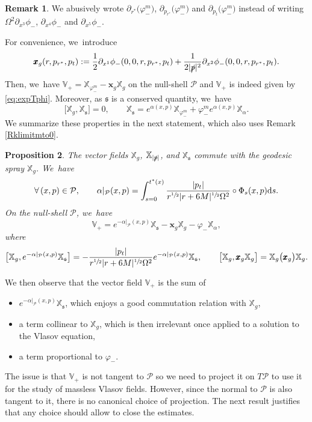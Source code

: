 \documentclass[JEP,XML,SOM,Unicode,published]{cedram}
\theoremstyle{plain}
\newtheorem{proposition}{Proposition}[section]
\theoremstyle{definition}
\newtheorem{remark}[proposition]{Remark}
\newcommand\T{{\mathbb{X}}}
\newcommand\dr{{\mathrm{d}}}
\begin{document}
\begin{remark}\label{Rkabuse}
We abusively wrote $\partial_{r^*}\bigl(\varphi_-^m \bigr)$, $\partial_{p_{r^*}}\bigl(\varphi_-^m \bigr)$ and $\partial_{p_t}\bigl(\varphi_-^m \bigr)$ instead of writing $\Omega^2 \partial_{x^3}\phi_-$, $\partial_{x^4} \phi_-$ and $\partial_{x^5} \phi_-$.
\end{remark} For convenience, we~introduce
\[
\pmb{x}_g(r,p_{r^*},p_t) := \frac{1}{2}\partial_{x^1} \phi_-(0,0,r,p_{r^*},p_t) +\frac{1}{2|\slashed{p}|^2} \partial_{x^2} \phi_- (0,0,r,p_{r^*},p_t).
\]
Then, we~have $\mathbb{V}_+=\T_{\varphi_-^m}-\pmb{x}_g \T_g$ on the null-shell $\mathcal{P}$ and $\mathbb{V}_+$ is indeed given by \eqref{eq:expTphi}. Moreover, as $\mathfrak{s}$ is a conserved quantity, we~have
\[
\bigl[ \T_g, \T_{\mathfrak{s}} \bigr]=0,\qquad \T_{\mathfrak{s}} = e^{\alpha (x,p)} \T_{\varphi_-^m}+\varphi_-^m e^{\alpha (x,p)} \T_{\alpha}.
\]
We summarize these properties in the next statement, which also uses Remark \ref{Rklimitmto0}.
\begin{proposition}\label{ProB2}
The vector fields $\T_g$, $\T_{|\slashed{p}|}$, and $\T_{\mathfrak{s}}$ commute with the geodesic spray $\T_g$. We~have
\[
\forall \, (x,p) \in \mathcal{P}, \qquad \alpha \vert_{\mathcal{P}} (x,p) = \int_{s=0}^{t^*(x)} \frac{|p_t|}{r^{\sfrac{1}{2}}|r+6M|^{\sfrac{1}{2}}\Omega^2} \circ \Phi_{s}(x,p) \dr s.
\]
On the null-shell $\mathcal{P}$, we~have
\[
\mathbb{V}_+ = e^{-\alpha \vert_{\mathcal{P}}(x,p)} \T_{\mathfrak{s}}-\pmb{x}_g \T_g-\varphi_- \T_{\alpha},
\]
where
\[
\bigl[\T_g, e^{-\alpha \vert_{\mathcal{P}}(x,p)} \T_{\mathfrak{s}} \bigr] = -\frac{|p_t|}{r^{\sfrac{1}{2}}|r+6M|^{\sfrac{1}{2}}\Omega^2} e^{-\alpha \vert_{\mathcal{P}}(x,p)}\T_{\mathfrak{s}}, \qquad \bigl[\T_g, \pmb{x}_g \T_g \bigr] = \T_g \bigl(\pmb{x}_g \bigr) \T_g.
\]
\end{proposition}

We then observe that the vector field $\mathbb{V}_+$ is the sum of
\begin{itemize}
\item $e^{-\alpha \vert_{\mathcal{P}}(x,p)} \T_{\mathfrak{s}}$, which enjoys a good commutation relation with $\T_g$,
\item a term collinear to $\T_g$, which is then irrelevant once applied to a solution to the Vlasov equation,
\item a term proportional to $\varphi_-$.
\end{itemize}
The issue is that $\mathbb{V}_+$ is not tangent to $\mathcal{P}$ so we need to project it on $T \mathcal{P}$ to use it for the study of massless Vlasov fields. However, since the normal to $\mathcal{P}$ is also tangent to it, there is no canonical choice of projection. The next result justifies that any choice should allow to close the estimates.
\end{document}
